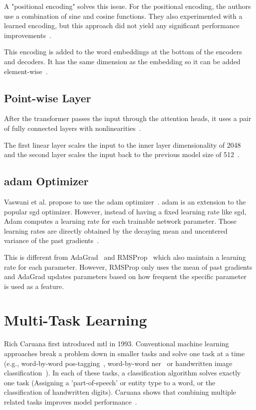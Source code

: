 A "positional encoding" solves this issue. For the positional encoding, the authors use a combination of sine and cosine functions. They also experimented with a learned encoding, but this approach did not yield any significant performance improvements~\cite{Vaswani2017d}.

This encoding is added to the word embeddings at the bottom of the encoders and decoders. It has the same dimension as the embedding so it can be added element-wise~\cite{Vaswani2017d}.


\subsection{Point-wise Layer}

After the transformer passes the input through the attention heads, it uses a pair of fully connected layers with nonlinearities~\cite{Vaswani2017d}. 

The first linear layer scales the input to the inner layer dimensionality of 2048 and the second layer scales the input back to the previous model size of 512~\cite{Vaswani2017d}.

\subsection{\gls{adam} Optimizer}

Vaswani et al. propose to use the \acrfull{adam} optimizer~\cite{Kingma2014}. \gls{adam} is an extension to the popular \gls{sgd} optimizer. However, instead of having a fixed learning rate like \gls{sgd}, Adam computes a learning rate for each trainable network parameter. Those learning rates are directly obtained by the decaying mean and uncentered variance of the past gradients~\cite{Kingma2014}.
\medskip

This is different from AdaGrad~\cite{Duchi2011} and RMSProp~\cite{Hinton} which also maintain a learning rate for each parameter. However, RMSProp only uses the mean of past gradients and AdaGrad updates parameters based on how frequent the specific parameter is used as a feature.

\section{Multi-Task Learning}

Rich Caruana first introduced \acrfull{mtl} in 1993. Conventional machine learning approaches break a problem down in smaller tasks and solve one task at a time (e.g., word-by-word \gls{pos}-tagging~\cite{Toutanova2007}, word-by-word \gls{ner}~\cite{Sang2003} or handwritten image classification~\cite{LeCun;1990}). In each of these tasks, a classification algorithm solves exactly one task (Assigning a 'part-of-speech' or entity type to a word, or the classification of handwritten digits). Caruana shows that combining multiple related tasks improves model performance~\cite{Caruana1993, Caruana1997a}. 


